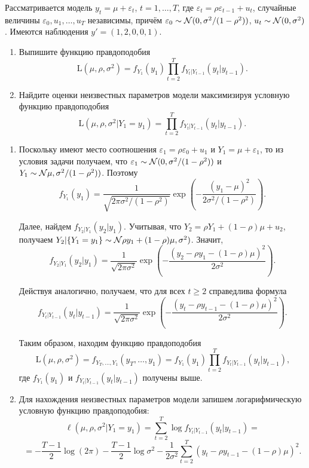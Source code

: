 \begin{problem}
Рассматривается модель $y_t = \mu + \varepsilon_t$, $t = 1,\ldots,T$, где $\varepsilon_t = \rho \varepsilon_{t-1} + u_t$, случайные величины $\varepsilon_0, u_1,\dots,u_T$ независимы, причём $\varepsilon_0 \sim \mathcal{N}(0,\sigma^2/(1 - \rho^2))$, $u_t \sim \mathcal{N}(0,\sigma^2)$. Имеются наблюдения $y' = (1, 2, 0, 0, 1)$.
\begin{enumerate}
  \item Выпишите функцию правдоподобия
  \[
  \mathrm{L}(\mu, \rho, \sigma^2) = f_{Y_1}(y_1)\prod_{t=2}^{T}f_{Y_t|Y_{t-1}}(y_t|y_{t-1}).
  \]
  \item Найдите оценки неизвестных параметров модели максимизируя условную функцию правдоподобия
  \[
  \mathrm{L}(\mu, \rho, \sigma^2|Y_1 = y_1) = \prod_{t=2}^{T}f_{Y_t|Y_{t-1}}(y_t|y_{t-1}).
  \]
\end{enumerate}


\begin{sol}
\begin{enumerate}
\item Поскольку имеют место соотношения $\varepsilon_1 = \rho \varepsilon_0 + u_1$ и $Y_1 =\mu + \varepsilon_1$, то из условия задачи получаем, что $\varepsilon_1 \sim \mathcal{N}(0,\sigma^2 / (1 - \rho^2))$
и $Y_1 \sim \mathcal{N}\mu,\sigma^2 / (1 - \rho^2))$. Поэтому
\[
f_{Y_1}(y_1) = \frac{1}{\sqrt{2\pi\sigma^2/(1-\rho^2)}}\exp{\left(-\frac{(y_1 - \mu)^2}{2\sigma^2/(1 - \rho^2)}\right)}.
\]

Далее, найдем $f_{Y_2|Y_1}(y_2|y_1)$. Учитывая, что $Y_2 = \rho Y_1 + (1- \rho) \mu + u_2$, получаем $Y_2|\{Y_1 = y_1\} \sim \mathcal{N}\rho y_1 + (1- \rho) \mu, \sigma^2)$. Значит,
\[
f_{Y_2|Y_1}(y_2|y_1) = \frac{1}{\sqrt{2\pi\sigma^2}}\exp{\left(-\frac{(y_2 - \rho y_1 - (1- \rho) \mu)^2}{2\sigma^2}\right)}.
\]

Действуя аналогично, получаем, что для всех $t \geq 2$ справедлива формула
\[
f_{Y_{t}|Y_{t-1}}(y_{t}|y_{t-1}) = \frac{1}{\sqrt{2\pi\sigma^2}}\exp{\left(-\frac{(y_{t} - \rho y_{t-1} - (1- \rho) \mu)^2}{2\sigma^2}\right)}.
\]

Таким образом, находим функцию правдоподобия
\[
\mathrm{L}(\mu, \rho, \sigma^2) = f_{Y_T,\ldots,Y_1}(y_T,\dots,y_1) = f_{Y_1}(y_1)\prod_{t=2}^{T}f_{Y_t|Y_{t-1}}(y_t|y_{t-1}) \text{,}
\]
где $f_{Y_1}(y_1)$ и $f_{Y_t|Y_{t-1}}(y_t|y_{t-1})$ получены выше.

\item Для нахождения неизвестных параметров модели запишем логарифмическую условную функцию правдоподобия:
\[
\ell(\mu, \rho, \sigma^2|Y_1 = y_1) = \sum_{t=2}^{T}\log{f_{Y_t|Y_{t-1}}(y_t|y_{t-1})} =
\]
\[
=-\frac{T-1}{2} \log(2 \pi) - \frac{T-1}{2} \log{\sigma^2} - \frac{1}{2\sigma^2} \sum_{t=2}^{T}(y_t - \rho y_{t-1} - (1 - \rho) \mu)^2 \text{.}
\]


\end{enumerate}
\end{sol}
\end{problem}
